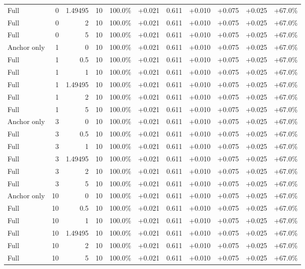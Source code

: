 \begin{table}[htbp]
\begin{tabular}{lrrrccccccc}
Full & 0 & 1.49495 & 10 & 100.0\% & +0.021 & 0.611 & +0.010 & +0.075 & +0.025 & +67.0\% \\
Full & 0 & 2 & 10 & 100.0\% & +0.021 & 0.611 & +0.010 & +0.075 & +0.025 & +67.0\% \\
Full & 0 & 5 & 10 & 100.0\% & +0.021 & 0.611 & +0.010 & +0.075 & +0.025 & +67.0\% \\
Anchor only & 1 & 0 & 10 & 100.0\% & +0.021 & 0.611 & +0.010 & +0.075 & +0.025 & +67.0\% \\
Full & 1 & 0.5 & 10 & 100.0\% & +0.021 & 0.611 & +0.010 & +0.075 & +0.025 & +67.0\% \\
Full & 1 & 1 & 10 & 100.0\% & +0.021 & 0.611 & +0.010 & +0.075 & +0.025 & +67.0\% \\
Full & 1 & 1.49495 & 10 & 100.0\% & +0.021 & 0.611 & +0.010 & +0.075 & +0.025 & +67.0\% \\
Full & 1 & 2 & 10 & 100.0\% & +0.021 & 0.611 & +0.010 & +0.075 & +0.025 & +67.0\% \\
Full & 1 & 5 & 10 & 100.0\% & +0.021 & 0.611 & +0.010 & +0.075 & +0.025 & +67.0\% \\
Anchor only & 3 & 0 & 10 & 100.0\% & +0.021 & 0.611 & +0.010 & +0.075 & +0.025 & +67.0\% \\
Full & 3 & 0.5 & 10 & 100.0\% & +0.021 & 0.611 & +0.010 & +0.075 & +0.025 & +67.0\% \\
Full & 3 & 1 & 10 & 100.0\% & +0.021 & 0.611 & +0.010 & +0.075 & +0.025 & +67.0\% \\
Full & 3 & 1.49495 & 10 & 100.0\% & +0.021 & 0.611 & +0.010 & +0.075 & +0.025 & +67.0\% \\
Full & 3 & 2 & 10 & 100.0\% & +0.021 & 0.611 & +0.010 & +0.075 & +0.025 & +67.0\% \\
Full & 3 & 5 & 10 & 100.0\% & +0.021 & 0.611 & +0.010 & +0.075 & +0.025 & +67.0\% \\
Anchor only & 10 & 0 & 10 & 100.0\% & +0.021 & 0.611 & +0.010 & +0.075 & +0.025 & +67.0\% \\
Full & 10 & 0.5 & 10 & 100.0\% & +0.021 & 0.611 & +0.010 & +0.075 & +0.025 & +67.0\% \\
Full & 10 & 1 & 10 & 100.0\% & +0.021 & 0.611 & +0.010 & +0.075 & +0.025 & +67.0\% \\
Full & 10 & 1.49495 & 10 & 100.0\% & +0.021 & 0.611 & +0.010 & +0.075 & +0.025 & +67.0\% \\
Full & 10 & 2 & 10 & 100.0\% & +0.021 & 0.611 & +0.010 & +0.075 & +0.025 & +67.0\% \\
Full & 10 & 5 & 10 & 100.0\% & +0.021 & 0.611 & +0.010 & +0.075 & +0.025 & +67.0\% \\

\end{tabular}
\end{table}
